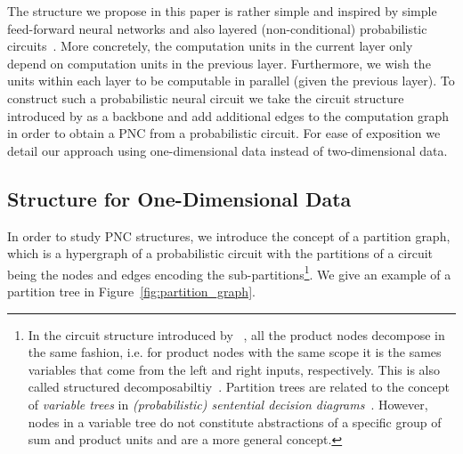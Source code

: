 \documentclass[letterpaper]{article} %
\newcommand{\ie}{i.e.\xspace}
\begin{document}
The structure we propose in this paper is rather simple and inspired by simple feed-forward neural networks and also layered (non-conditional) probabilistic circuits~\citep{peharz2020einsum}. More concretely,
the computation units in the current layer only depend on computation units in the previous layer. Furthermore, we wish the units within each layer to be computable in parallel (given the previous layer). To construct such a probabilistic neural circuit we take the circuit structure introduced by \citet{shih2021hyperspns} as a backbone and add additional edges to the computation graph in order to obtain a PNC from a probabilistic circuit.
For ease of exposition we detail our approach using one-dimensional data instead of two-dimensional data.

\subsection{Structure for One-Dimensional Data}

In order to study PNC structures, we introduce the concept of a partition graph, which is a hypergraph of a probabilistic circuit with the partitions of a circuit being the nodes and edges encoding the sub-partitions\footnote{In the circuit structure introduced by ~\citet{shih2021hyperspns}, all the product nodes decompose in the same fashion, \ie for product nodes with the same scope it is the sames variables that come from the left and right inputs, respectively. This is also called structured decomposabiltiy~\citep{darwiche2011sdd}. Partition trees are related to the concept of \textit{variable trees} in \textit{(probabilistic) sentential decision diagrams}~\citep{darwiche2011sdd,kisa2014probabilistic}. However, nodes in a variable tree do not constitute abstractions of a specific group of sum and product units and are a more general concept. }.  We give an example of a partition tree in Figure~\ref{fig:partition_graph}.
\end{document}
